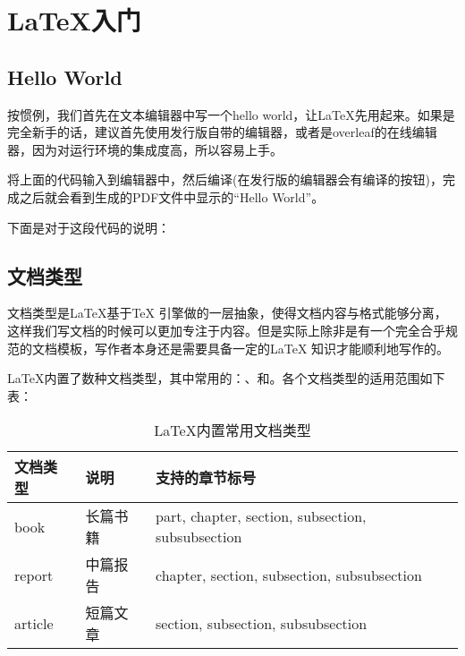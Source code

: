 \chapter{\LaTeX 入门}

\section{Hello World}
按惯例，我们首先在文本编辑器中写一个hello world，让\LaTeX 先用起来。如果是完全新手的话，建议首先使用发行版自带的编辑器，或者是overleaf的在线编辑器，因为对运行环境的集成度高，所以容易上手。


将上面的代码输入到编辑器中，然后编译(在发行版的编辑器会有编译的按钮)，完成之后就会看到生成的PDF文件中显示的“Hello
World”。

下面是对于这段代码的说明：
\begin{enumerate}
\end{enumerate}

\section{文档类型}\label{sec:doctype}
文档类型是\LaTeX 基于\TeX
引擎做的一层抽象，使得文档内容与格式能够分离，这样我们写文档的时候可以更加专注于内容。但是实际上除非是有一个完全合乎规范的文档模板，写作者本身还是需要具备一定的\LaTeX
知识才能顺利地写作的。

\LaTeX 内置了数种文档类型，其中常用的：、和。各个文档类型的适用范围如下表：
\noindent
\begin{table}[ht]
	\centering
	\begin{tabular}{lll} \toprule
		文档类型 & 说明     & 支持的章节标号                                    \\ \midrule
		book     & 长篇书籍 & part, chapter, section, subsection, subsubsection \\
		report   & 中篇报告 & chapter, section, subsection, subsubsection       \\
		article  & 短篇文章 & section, subsection, subsubsection                \\
		\bottomrule
	\end{tabular}
	\caption{\LaTeX 内置常用文档类型}
\end{table}

